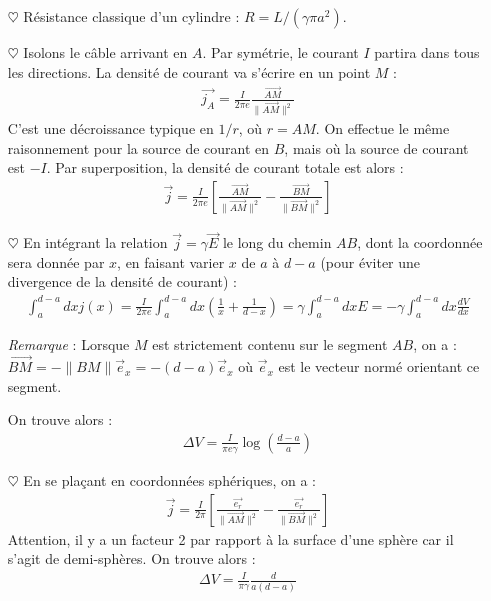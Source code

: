 \documentclass{report}
\begin{document}
\begin{itemize}

	\item[$\heartsuit$] Résistance classique d'un cylindre : $R=L/(\gamma\pi a^2)$.
	
	\item[$\heartsuit$] Isolons le câble arrivant en $A$. Par symétrie, le courant $I$ partira dans tous les directions. La densité de courant va s'écrire en un point $M$ :
	\begin{align*}
		\vec{j_A}=\frac{I}{2\pi e }\frac{\vec{AM}}{\|\vec{AM} \|^2}
	\end{align*}
	C'est une décroissance typique en $1/r$, où $r=AM$.
	On effectue le même raisonnement pour la source de courant en $B$, mais où la source de courant est $-I$. Par superposition, la densité de courant totale est alors :
	\begin{align*}
		\vec{j}=\frac{I}{2\pi e }\left[ \frac{\vec{AM}}{\|\vec{AM} \|^2} - \frac{\vec{BM}}{\|\vec{BM} \|^2}\right] 
	\end{align*}
	
	\item[$\heartsuit$] En intégrant la relation $\vec{j}=\gamma\vec{E}$ le long du chemin $AB$, dont la coordonnée sera donnée par $x$, en faisant varier $x$ de $a$ à $d-a$ (pour éviter une divergence de la densité de courant) :
	\begin{align*}
		\int_a^{d-a}dx j(x)=\frac{I}{2\pi e}\int_a^{d-a}dx\left(\frac{1}{x}+\frac{1}{d-x} \right) =\gamma\int_a^{d-a}dxE=-\gamma\int_a^{d-a}dx\frac{dV}{dx}
	\end{align*}
	
	\textit{Remarque} : Lorsque $M$ est strictement contenu sur le segment $AB$, on a : $\vec{BM} = -\|BM\|\vec{e}_x=-(d-a)\vec{e}_x$ où $\vec{e}_x$ est le vecteur normé orientant ce segment. 
	
	On trouve alors :
	\begin{align*}
		\Delta V = \frac{I}{\pi e\gamma}\log\left(\frac{d-a}{a} \right) 
	\end{align*}

	\item[$\heartsuit$] En se plaçant en coordonnées sphériques, on a :
	\begin{align*}
		\vec{j}=\frac{I}{2\pi}\left[ \frac{\vec{e_r}}{\|\vec{AM} \|^2} - \frac{\vec{e_r}}{\|\vec{BM} \|^2}\right] 
	\end{align*}
	Attention, il y a un facteur 2 par rapport à la surface d'une sphère car il s'agit de demi-sphères.
		On trouve alors :
	\begin{align*}
		\Delta V = \frac{I}{\pi \gamma}\frac{d}{a(d-a)}
	\end{align*}
	
\end{itemize}
\end{document}
